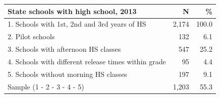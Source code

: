 
\begin{tabular}{lrr}
\toprule
State schools with high school, 2013 & N & \%\\
\midrule
1. Schools with 1st, 2nd and 3rd years of HS & 2,174 & 100.0\\
2. Pilot schools & 132 & 6.1\\
3. Schools with afternoon HS classes & 547 & 25.2\\
4. Schools with different release times within grade & 95 & 4.4\\
5. Schools without morning HS classes & 197 & 9.1\\
Sample (1 - 2 - 3 - 4 - 5) & 1,203 & 55.3\\
\bottomrule
\end{tabular}
